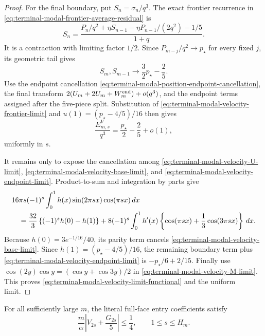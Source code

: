 \begin{proof}
For the final boundary, put $S_n=\sigma_n/q^3$.  The exact frontier recurrence
in \eqref{eq:terminal-modal-frontier-average-residual} is
\begin{equation}
 S_n=\frac{P_n/q^2+\eta S_{n-1}
 -\eta P_{n-1}/(2q^2)-1/5}{1+q}.
 \label{eq:terminal-modal-velocity-frontier-scaled}
\end{equation}
It is a contraction with limiting factor $1/2$.  Since
$P_{m-j}/q^2\to p_\star$ for every fixed $j$, its geometric tail gives
\begin{equation}
 S_m,S_{m-1}\longrightarrow\frac32p_\star-\frac25.
 \label{eq:terminal-modal-velocity-frontier-limit}
\end{equation}
Use the endpoint cancellation
\eqref{eq:terminal-modal-position-endpoint-cancellation}, the final transform
$2(U_m+2U_m+W_m^{\rm end})+o(q^3)$, and the endpoint terms assigned after the
five-piece split.  Substitution of
\eqref{eq:terminal-modal-velocity-frontier-limit} and
$u(1)=(p_\star-4/5)/16$ then gives
\begin{equation}
 \frac{E^V_{m,s}}{q^3}=\frac{p_\star}{2}-\frac25+o(1),
 \label{eq:terminal-modal-velocity-endpoint-limit}
\end{equation}
uniformly in $s$.

It remains only to expose the cancellation among
\eqref{eq:terminal-modal-velocity-U-limit},
\eqref{eq:terminal-modal-velocity-base-limit}, and
\eqref{eq:terminal-modal-velocity-endpoint-limit}.  Product-to-sum and
integration by parts give
\begin{align}
 &16\pi s(-1)^s\int_0^1h(x)\sin(2\pi sx)\cos(\pi sx)\,dx
 \notag\\
 &\quad=\frac{32}{3}\left\{(-1)^sh(0)-h(1)\right\}
 +8(-1)^s\int_0^1h'(x)
 \left\{\cos(\pi sx)+\frac13\cos(3\pi sx)\right\}\,dx.
 \label{eq:terminal-modal-velocity-U-parts}
\end{align}
Because $h(0)=3e^{-1/16}/40$, its parity term cancels
\eqref{eq:terminal-modal-velocity-base-limit}.  Since
$h(1)=(p_\star-4/5)/16$, the remaining boundary term plus
\eqref{eq:terminal-modal-velocity-endpoint-limit} is
$-p_\star/6+2/15$.  Finally use
$\cos(2y)\cos y=(\cos y+\cos3y)/2$ in
\eqref{eq:terminal-modal-velocity-M-limit}.  This proves
\eqref{eq:terminal-modal-velocity-limit-functional} and the uniform limit.
\end{proof}

\begin{theorem}
\label{lem:terminal-modal-velocity-profile}
For all sufficiently large $m$, the literal full-face entry coefficients
satisfy
\begin{equation}
 \frac m\alpha\left|V_{2s}+\frac{G_{2s}}5\right|\le\frac14,
 \qquad 1\le s\le H_m.
 \label{eq:terminal-modal-entry-velocity-profile}
\end{equation}
\end{theorem}

